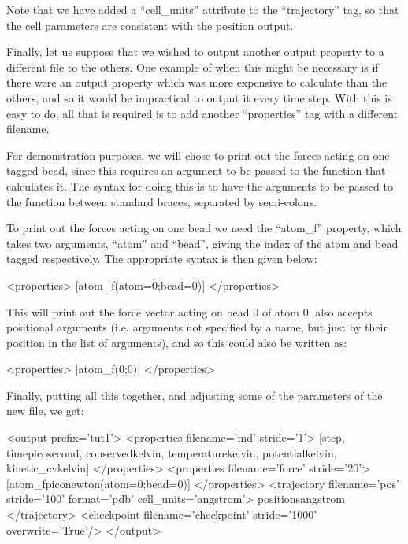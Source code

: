 \documentclass[11pt,english,fleqn]{report}
\newenvironment{code}{%
\footnotesize 
\verbatim
}{
\endverbatim
\normalsize
}
\begin{document}
Note that we have added a {}``cell\_units'' attribute
to the {}``trajectory'' tag, so that the
cell parameters are consistent with the position output.

Finally, let us suppose that we wished to output another output property
to a different file to the others. One example of when this 
might be necessary is if there
were an output property which was more expensive to calculate than the
others, and so it would be impractical to output it every time step.
With \ipi this is easy to do, all that is required is to add another
{}``properties'' tag with a different filename.

For demonstration purposes, we will chose to print out the forces
acting on one tagged bead, since this requires an argument to be
passed to the function that calculates it. The \ipi syntax for doing this is to have
the arguments to be passed to the function between standard braces,
separated by semi-colons.

To print out the forces acting on one bead we need the {}``atom\_f''
property, which takes two arguments, {}``atom'' and {}``bead'',
giving the index of the atom and bead tagged respectively. The
appropriate syntax is then given below:

\begin{code}
<properties> 
   [atom_f(atom=0;bead=0)] 
</properties>
\end{code}

This will print out the force vector acting on bead 0 of atom 0.
\ipi also accepts positional arguments
(i.e. arguments not specified by a name, but just by their position
in the list of arguments), and so this could also be written as:

\begin{code}
<properties> 
   [atom_f(0;0)] 
</properties>
\end{code}

Finally, putting all this together, and adjusting some
of the parameters of the new file, we get:

\begin{code}
<output prefix='tut1'>
   <properties filename='md' stride='1'> 
      [step, time{picosecond}, conserved{kelvin}, 
       temperature{kelvin}, potential{kelvin}, kinetic_cv{kelvin}] 
   </properties>
   <properties filename='force' stride='20'> 
      [atom_f{piconewton}(atom=0;bead=0)] 
   </properties>
   <trajectory filename='pos' stride='100' format='pdb' cell_units='angstrom'> 
      positions{angstrom} 
   </trajectory>
   <checkpoint filename='checkpoint' stride='1000' overwrite='True'/>
</output>
\end{code}
\end{document}
